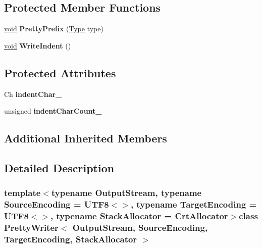 \subsection*{Protected Member Functions}
\begin{DoxyCompactItemize}
\item 
\hypertarget{class_pretty_writer_a7841433d45abbfc5a1799be0ca1ed792}{}\hyperlink{_s_d_l__audio_8h_a52835ae37c4bb905b903cbaf5d04b05f}{void} {\bfseries Pretty\+Prefix} (\hyperlink{rapidjson_8h_a1d1cfd8ffb84e947f82999c682b666a7}{Type} type)\label{class_pretty_writer_a7841433d45abbfc5a1799be0ca1ed792}

\item 
\hypertarget{class_pretty_writer_a649ec900d77960e085f76bb4d3c351d9}{}\hyperlink{_s_d_l__audio_8h_a52835ae37c4bb905b903cbaf5d04b05f}{void} {\bfseries Write\+Indent} ()\label{class_pretty_writer_a649ec900d77960e085f76bb4d3c351d9}

\end{DoxyCompactItemize}
\subsection*{Protected Attributes}
\begin{DoxyCompactItemize}
\item 
\hypertarget{class_pretty_writer_a2cee1f24795fd6c56420df31d336c41d}{}Ch {\bfseries indent\+Char\+\_\+}\label{class_pretty_writer_a2cee1f24795fd6c56420df31d336c41d}

\item 
\hypertarget{class_pretty_writer_ab2cffe9d93ce8a4890f927832f00d9f1}{}unsigned {\bfseries indent\+Char\+Count\+\_\+}\label{class_pretty_writer_ab2cffe9d93ce8a4890f927832f00d9f1}

\end{DoxyCompactItemize}
\subsection*{Additional Inherited Members}


\subsection{Detailed Description}
\subsubsection*{template$<$typename Output\+Stream, typename Source\+Encoding = U\+T\+F8$<$$>$, typename Target\+Encoding = U\+T\+F8$<$$>$, typename Stack\+Allocator = Crt\+Allocator$>$class Pretty\+Writer$<$ Output\+Stream, Source\+Encoding, Target\+Encoding, Stack\+Allocator $>$}

